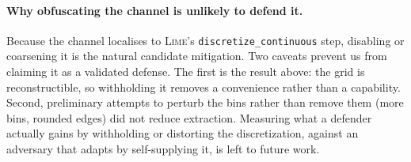 \documentclass[sigconf,anonymous,review]{acmart}
\begin{document}
\paragraph{Why obfuscating the channel is unlikely to defend it.} Because the channel localises to \textsc{Lime}'s
\texttt{discretize\_continuous} step, disabling or coarsening it is the natural candidate mitigation.
Two caveats prevent us from claiming it as a validated defense. The first is the result above: the
grid is reconstructible, so withholding it removes a convenience rather than a capability. Second,
preliminary attempts to perturb the bins rather than remove them (more bins, rounded edges) did not
reduce extraction. Measuring what a defender actually gains by withholding or distorting the
discretization, against an adversary that adapts by self-supplying it, is left to future work.
\end{document}
